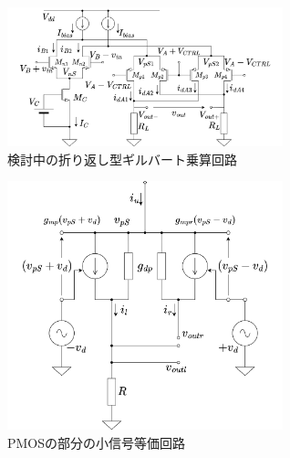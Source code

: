 \documentclass[twocolumn]{jsarticle}
\begin{document}
\begin{figure}[b]
    \includegraphics*[width=80mm]{figures/folded_gilbert.png}
    \caption{検討中の折り返し型ギルバート乗算回路}
\end{figure}

\begin{figure}[b]
    \includegraphics*[width=80mm]{figures/FoldedGilbertVctrlEquivalentCircuit.png}
    \caption{PMOSの部分の小信号等価回路}
\end{figure}
\end{document}
